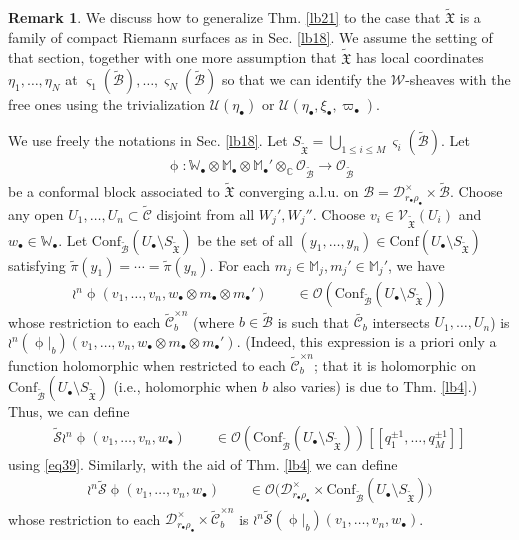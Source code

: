 \documentclass[12pt,a4paper,notitlepage]{article}
\theoremstyle{definition}
\newtheorem{rem}[df]{Remark}
\theoremstyle{plain}
\newcommand{\fk}{\mathfrak}
\newcommand{\mc}{\mathcal}
\newcommand{\wtd}{\widetilde}
\newcommand{\Conf}{\mathrm{Conf}}
\newcommand{\scr}{\mathscr}
\newcommand{\sgm}{\varsigma}
\newcommand{\blt}{\bullet}
\newcommand{\Wbb}{\mathbb W}
\newcommand{\Mbb}{\mathbb M}
\newcommand{\Cbb}{\mathbb C}
\newcommand{\SXtd}{S_{\wtd{\fk X}}}
\numberwithin{equation}{section}
\begin{document}
\begin{rem}\label{lb23}
We discuss how to generalize Thm. \ref{lb21} to the case that $\wtd{\fk X}$ is a family of compact Riemann surfaces as in Sec. \ref{lb18}. We assume the setting of that section, together with one more assumption that $\wtd{\fk X}$ has local coordinates $\eta_1,\dots,\eta_N$ at $\sgm_1(\wtd{\mc B}),\dots,\sgm_N(\wtd{\mc B})$ so that we can identify the $\scr W$-sheaves with the free ones using the trivialization $\mc U(\eta_\blt)$ or $\mc U(\eta_\blt,\xi_\blt,\varpi_\blt)$.

We use freely the notations in Sec. \ref{lb18}. Let $\SXtd=\bigcup_{1\leq i\leq M}\sgm_i(\wtd{\mc B})$. Let
\begin{align*}
\upphi:\Wbb_\blt\otimes\Mbb_\blt\otimes\Mbb_\blt'\otimes_\Cbb\scr O_{\wtd{\mc B}}\rightarrow \scr O_{\wtd{\mc B}}	
\end{align*}
be a conformal block associated to $\wtd{\fk X}$ converging a.l.u. on $\mc B=\mc D_{r_\blt\rho_\blt}^\times\times\wtd{\mc B}$. Choose any open $U_1,\dots,U_n\subset\wtd{\mc C}$ disjoint from all $W_j',W_j''$. Choose $v_i\in\scr V_{\wtd{\fk X}}(U_i)$ and $w_\blt\in\Wbb_\blt$. Let $\Conf_{\wtd{\mc B}}(U_\blt\setminus\SXtd)$ be the set of all $(y_1,\dots,y_n)\in\Conf(U_\blt\setminus\SXtd)$ satisfying $\wtd\pi(y_1)=\cdots=\wtd\pi(y_n)$.  For each $m_j\in\Mbb_j,m_j'\in\Mbb_j'$, we have
\begin{align*}
	\wr^n\upphi(v_1,\dots,v_n,w_\blt\otimes m_\blt\otimes m_\blt')\qquad \in\scr O(\Conf_{\wtd{\mc B}}(U_\blt\setminus\SXtd))	
\end{align*}
whose restriction to each $\wtd{\mc C}_b^{\times n}$ (where $b\in\wtd{\mc B}$ is such that $\wtd{\mc C_b}$ intersects $U_1,\dots,U_n$) is $\wr^n(\upphi|_b)(v_1,\dots,v_n,w_\blt\otimes m_\blt\otimes m_\blt')$. (Indeed, this expression is a priori only a function holomorphic when restricted to each $\wtd{\mc C}_b^{\times n}$; that it is holomorphic on $\Conf_{\wtd{\mc B}}(U_\blt\setminus\SXtd)$ (i.e., holomorphic when $b$ also varies) is due to Thm. \ref{lb4}.) Thus, we can define
\begin{align}
\wtd{\mc S}\wr^n\upphi(v_1,\dots,v_n,w_\blt)\qquad\in\scr O(\Conf_{\wtd{\mc B}}(U_\blt\setminus\SXtd))[[q_1^{\pm 1},\dots,q_M^{\pm 1}]] \label{eq40}
\end{align}
using \eqref{eq39}. Similarly, with the aid of Thm. \ref{lb4} we can define
\begin{align}
\wr^n\wtd{\mc S}\upphi(v_1,\dots,v_n,w_\blt)	\qquad\in\scr O\big(\mc D_{r_\blt\rho_\blt}^\times\times\Conf_{\wtd{\mc B}}(U_\blt\setminus\SXtd)\big)	\label{eq41}
\end{align}
whose restriction to each $\mc D_{r_\blt\rho_\blt}^\times\times\wtd{\mc C}_b^{\times n}$ is $\wr^n\wtd{\mc S}(\upphi|_b)(v_1,\dots,v_n,w_\blt)$.




\end{rem}
\end{document}
